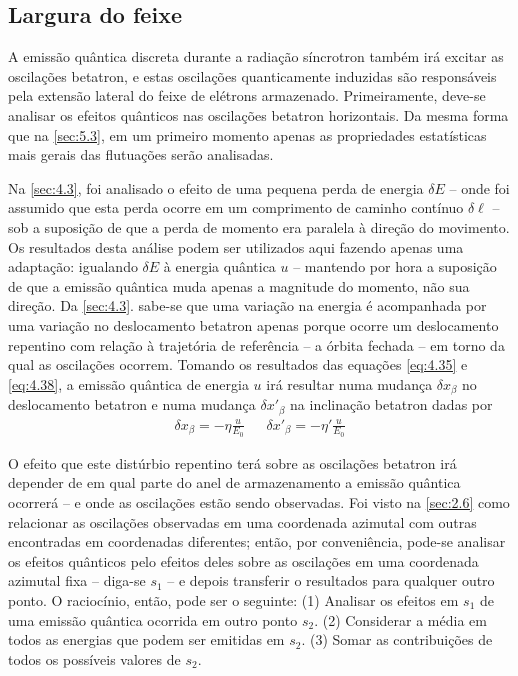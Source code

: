 \subsection{Largura do feixe}
A emissão quântica discreta durante a radiação síncrotron também irá excitar as oscilações betatron, e estas oscilações quanticamente induzidas são responsáveis pela extensão lateral do feixe de elétrons armazenado. Primeiramente, deve-se analisar os efeitos quânticos nas oscilações betatron horizontais. Da mesma forma que na \autoref{sec:5.3}, em um primeiro momento apenas as propriedades estatísticas mais gerais das flutuações serão analisadas.

Na \autoref{sec:4.3}, foi analisado o efeito de uma pequena perda de energia $\delta E$ -- onde foi assumido que esta perda ocorre em um comprimento de caminho contínuo $\delta \ell$ -- sob a suposição de que a perda de momento era paralela à direção do movimento. Os resultados desta análise podem ser utilizados aqui fazendo apenas uma adaptação: igualando $\delta E$ à energia quântica $u$ -- mantendo por hora a suposição de que a emissão quântica muda apenas a magnitude do momento, não sua direção. Da \autoref{sec:4.3}. sabe-se que uma variação na energia é acompanhada por uma variação no deslocamento betatron apenas porque ocorre um deslocamento repentino com relação à trajetória de referência -- a órbita fechada -- em torno da qual as oscilações ocorrem. Tomando os resultados das equações \eqref{eq:4.35} e \eqref{eq:4.38}, a emissão quântica de energia $u$ irá resultar numa mudança $\delta x_\beta$ no deslocamento betatron e numa mudança $\delta x'_\beta$ na inclinação betatron dadas por
\begin{align}
	\delta x_\beta = -\eta \frac{u}{E_0}\ \ \ \ \ \ \ \delta x'_\beta = -\eta' \frac{u}{E_0}\label{eq:5.67}
\end{align}

O efeito que este distúrbio repentino terá sobre as oscilações betatron irá depender de em qual parte do anel de armazenamento a emissão quântica ocorrerá -- e onde as oscilações estão sendo observadas. Foi visto na \autoref{sec:2.6} como relacionar as oscilações observadas em uma coordenada azimutal com outras encontradas em coordenadas diferentes; então, por conveniência, pode-se analisar os efeitos quânticos pelo efeitos deles sobre as oscilações em uma coordenada azimutal fixa -- diga-se $s_1$ -- e depois transferir o resultados para qualquer outro ponto. O raciocínio, então, pode ser o seguinte: (1) Analisar os efeitos em $s_1$ de uma emissão quântica ocorrida em outro ponto $s_2$. (2) Considerar a média em todos as energias que podem ser emitidas em $s_2$. (3) Somar as contribuições de todos os possíveis valores de $s_2$. 

